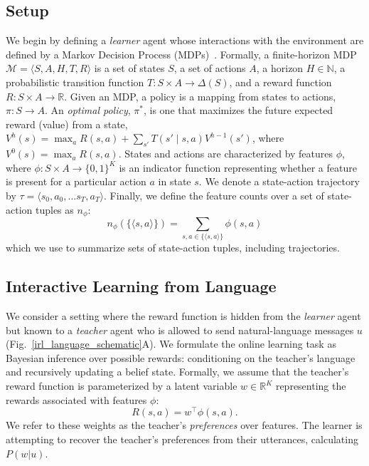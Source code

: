 \documentclass[letterpaper]{article} %
\begin{document}
\subsection{Setup}
We begin by defining a \emph{learner} agent whose interactions with the environment are defined by a Markov Decision Process (MDPs)~\cite{puterman1994markov}.
Formally, a finite-horizon MDP $\mathcal{M} = \langle S, A, H, T, R \rangle$ is a set of states $S$, a set of actions $A$, a horizon $H \in \mathbb{N}$, a probabilistic transition function $T: S \times A \rightarrow \Delta(S)$, and a reward function $R: S \times A \rightarrow \mathbb{R}$. Given an MDP, a policy is a mapping from states to actions, $\pi: S \rightarrow A$.
An \emph{optimal policy}, $\pi^*$, is one that maximizes the future expected reward (value) from a state, $V^h(s) = \max_a R(s, a) + \sum_{s'} T(s' \mid s, a) V^{h - 1}(s')$, where $V^0(s) = \max_a R(s, a)$.
States and actions are characterized by features $\phi$, where $\phi: S \times A \rightarrow \{0, 1\}^{K}$ is an indicator function representing whether a feature is present for a particular action $a$ in state $s$.
We denote a state-action trajectory by $\tau = \langle s_0, a_0, ... s_T, a_T \rangle$. Finally, we define the feature counts over a set of state-action tuples as $n_\phi$:
\begin{equation}
n_\phi(\{\langle s,a\rangle\}) = \sum_{s,a\in\{\langle s,a\rangle\}}\phi(s,a)
\end{equation}
which we use to summarize sets of state-action tuples, including trajectories.

\subsection{Interactive Learning from Language}
\label{bayesian_lr_section}
We consider a setting where the reward function is hidden from the \emph{learner} agent but known to a \emph{teacher} agent who is allowed to send natural-language messages $u$ (Fig.~\ref{irl_language_schematic}A).
We formulate the online learning task as Bayesian inference over possible rewards: conditioning on the teacher's language and recursively updating a belief state.
Formally, we assume that the teacher's reward function is parameterized by a latent variable $w \in \mathbb{R}^K$ representing the rewards associated with features $\phi$:
\begin{equation}
R(s,a) = w^{\top}\phi(s, a).
\end{equation}
We refer to these weights as the teacher's \textit{preferences} over features.
The learner is attempting to recover the teacher's preferences from their utterances, calculating $P(w | u)$.
\end{document}
